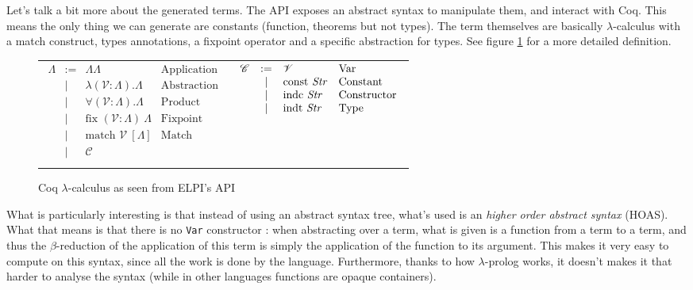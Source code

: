 \documentclass{article}
\newcommand{\C}{\mathscr{C}}
\newcommand{\V}{\mathscr{V}}
\begin{document}
Let's talk a bit more about the generated terms. The API exposes an abstract
syntax to manipulate them, and interact with Coq. This means the only thing we
can generate are constants (function, theorems but not types). The term themselves
are basically $\lambda$-calculus with a match construct, types annotations, a
fixpoint operator and a specific abstraction for types. See figure \ref{LambdaCoq}
for a more detailed definition.

\begin{figure}
    \begin{center}\begin{tabular}{cc}
        $\begin{array}{rcll}
            \Lambda & := & \Lambda\Lambda & \text{Application} \\
                    & |  & \lambda (\V : \Lambda). \Lambda & \text{Abstraction} \\
                    & |  & \forall (\V : \Lambda). \Lambda & \text{Product} \\
                    & |  & \text{fix } (\V : \Lambda)\ \Lambda & \text{Fixpoint} \\
                    & |  & \text{match } \V\ [\Lambda] & \text{Match} \\
                    & |  & \C & \\
        \end{array}$ & $\begin{array}{rcll}
            \C & := & \V & \text{Var} \\
               & |  & \text{const \emph{Str}} & \text{Constant} \\
               & |  & \text{indc \emph{Str}}  & \text{Constructor} \\
               & |  & \text{indt \emph{Str}}  & \text{Type} \\
        \end{array}$ \\
    \end{tabular}\end{center}
    \caption{Coq $\lambda$-calculus as seen from ELPI's API}
    \label{LambdaCoq}
\end{figure}

What is particularly interesting is that instead of using an abstract syntax tree,
what's used is an \emph{higher order abstract syntax} (HOAS). What that means is
that there is no \texttt{Var} constructor : when abstracting over a term, what
is given is a function from a term to a term, and thus the $\beta$-reduction
of the application of this term is simply the application of the function to
its argument. This makes it very easy to compute on this syntax, since all the
work is done by the language. Furthermore, thanks to how $\lambda$-prolog works,
it doesn't makes it that harder to analyse the syntax (while in other languages
functions are opaque containers).
\end{document}
